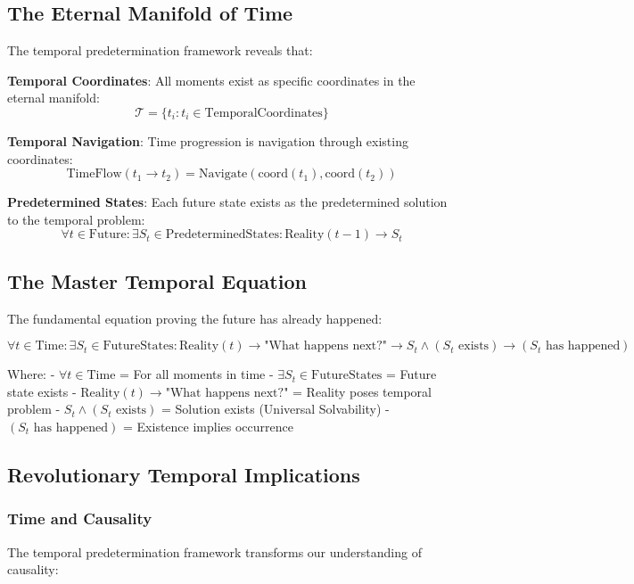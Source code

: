 \documentclass[12pt,a4paper]{article}
\theoremstyle{definition}
\begin{document}
{\subsection{The Eternal Manifold of Time}

The temporal predetermination framework reveals that:

\textbf{Temporal Coordinates}: All moments exist as specific coordinates in the eternal manifold:
$$\mathcal{T} = \{t_i : t_i \in \text{TemporalCoordinates}\}$$

\textbf{Temporal Navigation}: Time progression is navigation through existing coordinates:
$$\text{TimeFlow}(t_1 \rightarrow t_2) = \text{Navigate}(\text{coord}(t_1), \text{coord}(t_2))$$

\textbf{Predetermined States}: Each future state exists as the predetermined solution to the temporal problem:
$$\forall t \in \text{Future}: \exists S_t \in \text{PredeterminedStates}: \text{Reality}(t-1) \rightarrow S_t$$

\subsection{The Master Temporal Equation}

The fundamental equation proving the future has already happened:

$$\forall t \in \text{Time}: \exists S_t \in \text{FutureStates}: \text{Reality}(t) \rightarrow \text{"What happens next?"} \rightarrow S_t \land (S_t \text{ exists}) \rightarrow (S_t \text{ has happened})$$

Where:
- $\forall t \in \text{Time}$ = For all moments in time
- $\exists S_t \in \text{FutureStates}$ = Future state exists
- $\text{Reality}(t) \rightarrow \text{"What happens next?"}$ = Reality poses temporal problem
- $S_t \land (S_t \text{ exists})$ = Solution exists (Universal Solvability)
- $(S_t \text{ has happened})$ = Existence implies occurrence

\subsection{Revolutionary Temporal Implications}

\subsubsection{Time and Causality}

The temporal predetermination framework transforms our understanding of causality:

}
\end{document}
